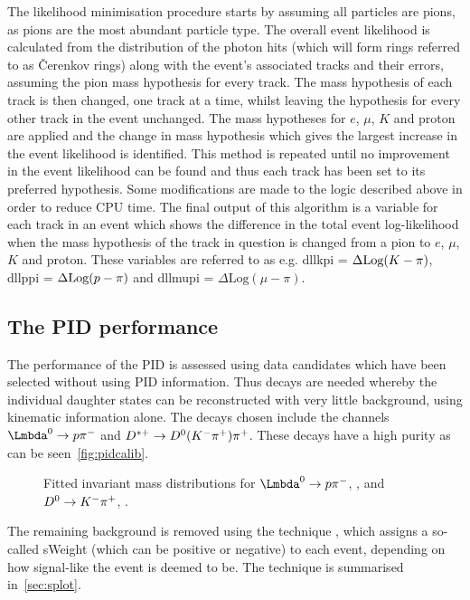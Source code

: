 
The likelihood minimisation procedure starts by assuming all particles are pions, as pions are the most abundant particle type. The overall event likelihood is calculated from the distribution of the photon hits (which will form rings referred to as \v{C}erenkov rings) along with the event's associated tracks and their errors, assuming the pion mass hypothesis for every track. The mass hypothesis of each track is then changed, one track at a time, whilst leaving the hypothesis for every other track in the event unchanged. The mass hypotheses for $e$, $\mu$, $K$ and proton are applied and the change in mass hypothesis which gives the largest increase in the event likelihood is identified. This method is repeated until no improvement in the event likelihood can be found and thus each track has been set to its preferred hypothesis. Some modifications are made to the logic described above in order to reduce CPU time. The final output of this algorithm is a variable for each track in an event which shows the difference in the total event log-likelihood when the mass hypothesis of the track in question is changed from a pion to $e$, $\mu$, $K$ and proton. These variables are referred to as e.g. \gls{dllkpi}  = $\Delta \text{Log}({K} - \pi)$, \gls{dllppi} = $\Delta \text{Log}({p} - \pi)$ and \gls{dllmupi} = $\Delta \text{Log}(\mu - \pi)$. %
\subsection{The PID performance}
\label{sec:pidperf}

The performance of the PID is assessed using data candidates which have been selected without using PID information. Thus decays are needed whereby the individual daughter states can be reconstructed with very little background, using kinematic information alone. The decays chosen include the channels $\PLambda^{0}\to\proton\pim$ and $D^{*+} \rightarrow D^{0}({K}^{-}{{\pi}^+}){{\pi}^+}$. These decays have a high purity as can be seen~\autoref{fig:pidcalib}.
\begin{figure}[h!]
  \centering
  \caption{Fitted invariant mass distributions for $\PLambda^{0}\to\proton\pim$, \protect{}, and $D^{0}\rightarrow {\ensuremath{K}}^{-}{{\pi}^+}$, \protect{} \cite{LHCb-DP-2012-003}.}
  \label{fig:pidcalib}
\end{figure}
The remaining background is removed using the \sPlot technique \cite{sPlot}, which assigns a so-called sWeight (which can be positive or negative) to each event, depending on how signal-like the event is deemed to be.  The \sPlot technique is summarised in~\autoref{sec:splot}.

